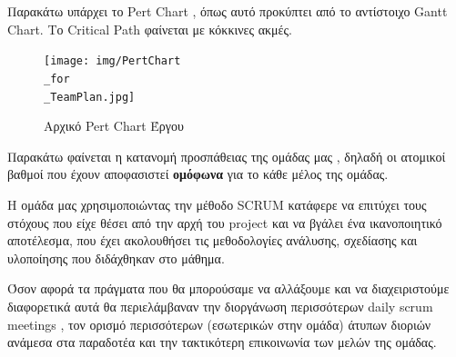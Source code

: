 \documentclass{../ol-softwaremanual}
\begin{document}
	
	\flushleft
	Παρακάτω υπάρχει το \en Pert Chart \gr, όπως αυτό προκύπτει από το αντίστοιχο \en Gantt Chart\gr. Το \en Critical Path \gr φαίνεται με κόκκινες ακμές.
	
	\begin{figure}[htbp!]
		
		\texttt{[image: img/PertChart\\\_for\\\_TeamPlan.jpg]}
		\caption{Αρχικό \en Pert Chart \gr Έργου}
	\end{figure}
	
	\flushleft
	Παρακάτω φαίνεται η κατανομή προσπάθειας της ομάδας μας , δηλαδή οι ατομικοί βαθμοί που έχουν αποφασιστεί \textbf{ομόφωνα} για το κάθε μέλος της ομάδας.
	
	
	\flushleft
	Η ομάδα μας χρησιμοποιώντας την μέθοδο \en SCRUM \gr κατάφερε να επιτύχει τους στόχους που είχε θέσει από την αρχή του \en project \gr και να βγάλει ένα ικανοποιητικό αποτέλεσμα, που έχει ακολουθήσει τις μεθοδολογίες ανάλυσης, σχεδίασης και υλοποίησης που διδάχθηκαν στο μάθημα. \break
	
	Όσον αφορά τα πράγματα που θα μπορούσαμε να αλλάξουμε και να διαχειριστούμε διαφορετικά αυτά θα περιελάμβαναν την διοργάνωση περισσότερων \en daily scrum meetings \gr, τον ορισμό περισσότερων (εσωτερικών στην ομάδα) άτυπων διοριών ανάμεσα στα παραδοτέα και την τακτικότερη επικοινωνία των μελών της ομάδας.
\end{document}
